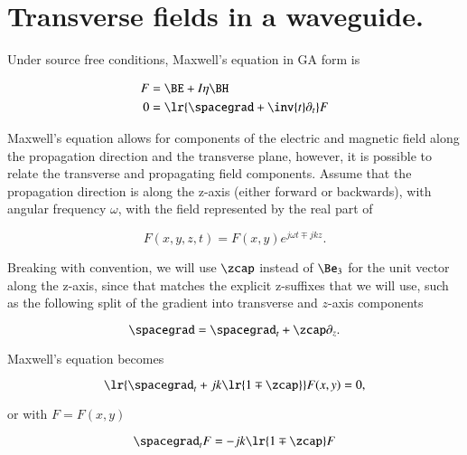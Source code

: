 %
%
\section{Transverse fields in a waveguide.}

Under source free conditions, Maxwell's equation in GA form is

\begin{equation}\label{eqn:transverseField:2}
\begin{aligned}
F &= \BE + I \eta \BH \\
0 &= \lr{ \spacegrad + \inv{t} \partial_t } F
\end{aligned}
\end{equation}

Maxwell's equation allows for components of the electric and magnetic field along the propagation direction and the transverse plane, however, it is possible to relate the transverse and propagating field components.  Assume that the propagation direction is along the z-axis (either forward or backwards), with angular frequency \( \omega \), with the field represented by the real part of

\begin{dmath}\label{eqn:transverseField:28}
F(x, y, z, t) = F(x, y) e^{j \omega t \mp j k z}.
\end{dmath}

Breaking with convention, we will use \( \zcap \) instead of \( \Be_3 \) for the unit vector along the z-axis, since that matches the explicit z-suffixes that we will use, such as the following split of the
gradient into transverse and \(z\)-axis components

\begin{dmath}\label{eqn:transverseField:88}
\spacegrad = \spacegrad_t + \zcap \partial_z.
\end{dmath}

Maxwell's equation becomes

\begin{equation}\label{eqn:transverseField:summaryMax2}
\lr{\spacegrad_t + j k \lr{ 1 \mp \zcap } } F(x,y) = 0,
\end{equation}

or with \( F = F(x, y) \)

\begin{dmath}\label{eqn:transverseField:148}
\spacegrad_t F = - j k \lr{ 1 \mp \zcap } F
\end{dmath}

